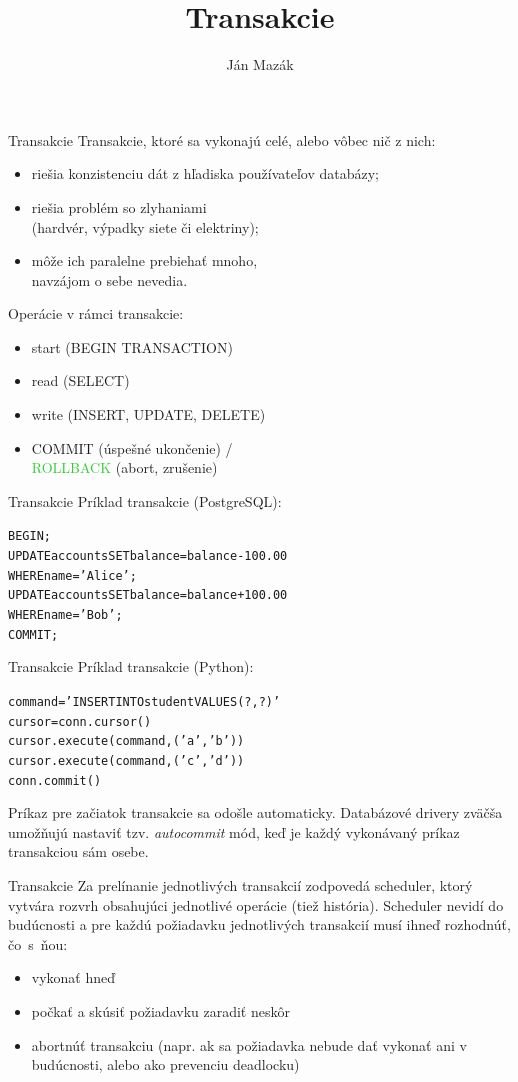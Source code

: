 \documentclass[12pt]{beamer}
\title{Transakcie}
\author{Ján Mazák}
\institute{FMFI UK Bratislava}
\date{}
\def\blue#1{\textcolor{Cerulean}{#1}}
\def\green#1{\textcolor{LimeGreen}{#1}}
\begin{document}
\frame{\titlepage}


\begin{frame}[fragile]{Transakcie}
\alert{Transakcie}, ktoré sa vykonajú celé, alebo vôbec nič z nich:
\begin{itemize}
\item riešia konzistenciu dát z hľadiska používateľov databázy;
\item riešia problém so zlyhaniami\\ (hardvér, výpadky siete či elektriny);
\item môže ich paralelne prebiehať mnoho,\\ navzájom o sebe nevedia.
\end{itemize}

\bigskip
Operácie v rámci transakcie:
\begin{itemize}
\item start (BEGIN TRANSACTION)
\item read (SELECT)
\item write (INSERT, UPDATE, DELETE)
\item \blue{COMMIT} (úspešné ukončenie) /\\\green{ROLLBACK} (abort, zrušenie)
\end{itemize}
\end{frame}


\begin{frame}[fragile]{Transakcie}
Príklad transakcie (PostgreSQL):
\begin{alltt}
    BEGIN;
    UPDATE accounts SET balance = balance - 100.00
        WHERE name = 'Alice';
    UPDATE accounts SET balance = balance + 100.00
        WHERE name = 'Bob';
    COMMIT;
\end{alltt}
\end{frame}


\begin{frame}[fragile]{Transakcie}
Príklad transakcie (Python):
\begin{alltt}
    command = 'INSERT INTO student VALUES (?, ?)'
    cursor = conn.cursor()
    cursor.execute(command, ('a', 'b'))
    cursor.execute(command, ('c', 'd'))
    conn.commit()
\end{alltt}
Príkaz pre začiatok transakcie sa odošle automaticky.
Databázové drivery zväčša umožňujú nastaviť tzv. \emph{autocommit} mód,
keď je každý vykonávaný príkaz transakciou sám osebe.
\end{frame}


\begin{frame}[fragile]{Transakcie}
Za prelínanie jednotlivých transakcií zodpovedá \blue{scheduler},
ktorý vytvára \alert{rozvrh} obsahujúci jednotlivé operácie (tiež \alert{história}).
Scheduler nevidí do budúcnosti a pre každú požiadavku jednotlivých transakcií
musí ihneď rozhodnúť, čo~s~ňou:
\begin{itemize}
\item vykonať hneď
\item počkať a skúsiť požiadavku zaradiť neskôr
\item abortnúť transakciu (napr. ak sa požiadavka nebude dať vykonať ani v budúcnosti, alebo ako prevenciu deadlocku)
\end{itemize}
\end{frame}
\end{document}
